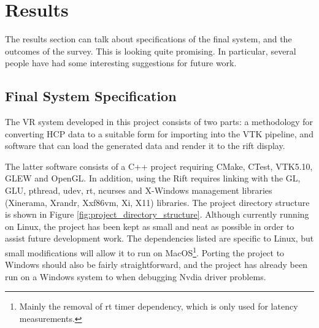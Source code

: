 \documentclass[MSc,paper=a4,pagesize=auto]{icldt}
\begin{document}
\chapter{Results}
The results section can talk about specifications of the final system, and the outcomes of the survey. This is looking quite promising. In particular, several people have had some interesting suggestions for future work. 

\section{Final System Specification}
The VR system developed in this project consists of two parts: a methodology for converting HCP data to a suitable form for importing into the VTK pipeline, and software that can load the generated data and render it to the rift display. 

The latter software consists of a C++ project requiring CMake, CTest, VTK5.10, GLEW and OpenGL. In addition, using the Rift requires linking with the GL, GLU, pthread, udev, rt, ncurses and X-Windows management libraries (Xinerama, Xrandr, Xxf86vm, Xi, X11) libraries. The project directory structure is shown in Figure \ref{fig:project_directory_structure}. Although currently running on Linux, the project has been kept as small and neat as possible in order to assist future development work. The dependencies listed are specific to Linux, but small modifications will allow it to run on MacOS\footnote{Mainly the removal of rt timer dependency, which is only used for latency measurements.}. Porting the project to Windows should also be fairly straightforward, and the project has already been run on a Windows system to when debugging Nvdia driver problems.
\end{document}
